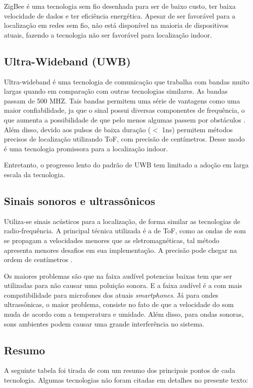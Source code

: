 ZigBee é uma tecnologia sem fio desenhada para ser de baixo custo, ter baixa velocidade de dados e ter eficiência energética. Apesar de ser favorável para a localização em redes sem fio, não está disponível na maioria de dispositivos atuais, fazendo a tecnologia não ser favorável para localização indoor. \cite{art2}

\subsection{Ultra-Wideband (UWB)}
Ultra-wideband é uma tecnologia de comunicação que trabalha com bandas muito largas quando em comparação com outras tecnologias similares. As bandas passam de 500 MHZ. Tais bandas permitem uma série de vantagens como uma maior confiabilidade, ja que o sinal possui diversas componentes de frequência, o que aumenta a possibilidade de que pelo menos algumas passem por obstáculos \cite{art10}.
Além disso, devido aos pulsos de baixa duração (\(<\) 1ns) permitem métodos precisos de localização utilizando ToF, com precisão de centímetros. Desse modo é uma tecnologia promissora para a localização indoor.

Entretanto, o progresso lento do padrão de UWB tem limitado a adoção em larga escala da tecnologia.


\subsection{Sinais sonoros e ultrassônicos}

Utiliza-se sinais acústicos para a localização, de forma similar as tecnologias de radio-frequência.
A principal técnica utilizada é a de ToF, como as ondas de som se propagam a velocidades menores que as eletromagnéticas, tal método apresenta menores desafios em sua implementação. A precisão pode chegar na ordem de centímetros \cite{art11}.

Os maiores problemas são que na faixa audível potencias baixas tem que ser utilizadas para não causar uma poluição sonora. E a faixa audível é a com mais compatibilidade para microfones dos atuais \textit{smartphones}. Já para ondes ultrassônicas, o maior problema, consiste no fato de que a velocidade do som muda de acordo com a temperatura e umidade. Além disso, para ondas sonoras, sons ambientes podem causar uma grande interferência no sistema.


\subsection{Resumo}
A seguinte tabela foi tirada de \cite{art2} com um resumo dos principais pontos de cada tecnologia. Algumas tecnologias não foram citadas em detalhes no presente texto:

